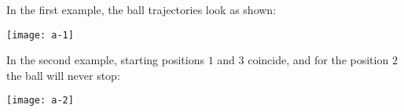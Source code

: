 In the first example, the ball trajectories look as shown:

\begin{center}
\texttt{[image: a-1]}
\end{center}

In the second example, starting positions $1$ and $3$ coincide, and for
the position $2$ the ball will never stop:

\begin{center}
\texttt{[image: a-2]}
\end{center}